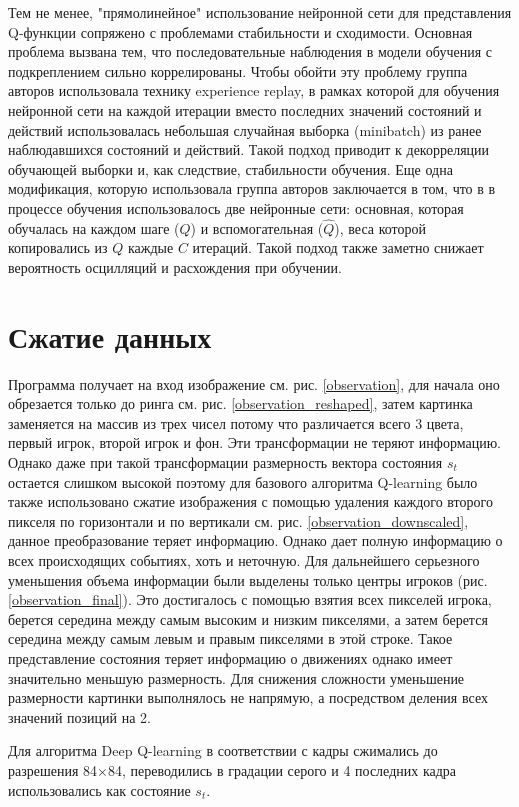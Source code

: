 \documentclass{letask}
\begin{document}
Тем не менее, "прямолинейное" использование нейронной сети для представления Q-функции сопряжено с проблемами стабильности и сходимости. Основная проблема вызвана тем, что последовательные наблюдения в модели обучения с подкреплением сильно коррелированы. Чтобы обойти эту проблему группа авторов \cite{Mnih} использовала технику experience replay, в рамках которой для обучения нейронной сети на каждой итерации вместо последних значений состояний и действий использовалась небольшая случайная выборка (minibatch) из ранее наблюдавшихся состояний и действий. Такой подход приводит к декорреляции обучающей выборки и, как следствие, стабильности обучения. Еще одна модификация, которую использовала группа авторов \cite{Mnih} заключается в том, что в в процессе обучения использовалось две нейронные сети: основная, которая обучалась на каждом шаге ($Q$) и вспомогательная ($\hat{Q}$), веса которой копировались из $Q$ каждые $C$ итераций. Такой подход также заметно снижает вероятность осцилляций и расхождения при обучении. 


\section{Сжатие данных}
Программа получает на вход изображение см. рис. \ref{observation}, для начала оно обрезается только до ринга см. рис. \ref{observation_reshaped}, затем картинка заменяется на массив из трех чисел потому что различается всего 3 цвета, первый игрок, второй игрок и фон. Эти трансформации не теряют информацию. Однако даже при такой трансформации размерность вектора состояния $s_t$ остается слишком высокой поэтому для базового алгоритма Q-learning было также использовано сжатие изображения с помощью удаления каждого второго пикселя по горизонтали и по вертикали см. рис. \ref{observation_downscaled}, данное преобразование теряет информацию. Однако дает полную информацию о всех происходящих событиях, хоть и неточную. Для дальнейшего серьезного уменьшения объема информации были выделены только центры игроков (рис. \ref{observation_final}). Это достигалось с помощью взятия всех пикселей игрока, берется середина между самым высоким и низким пикселями, а затем берется середина между самым левым и правым пикселями в этой строке. Такое представление состояния теряет информацию о движениях однако имеет значительно меньшую размерность. Для снижения сложности уменьшение размерности картинки выполнялось не напрямую, а посредством деления всех значений позиций на 2.  

Для алгоритма Deep Q-learning в соответствии с \cite{Mnih} кадры сжимались до разрешения 84$\times$84, переводились в градации серого и 4 последних кадра использовались как состояние $s_t$.
\end{document}
